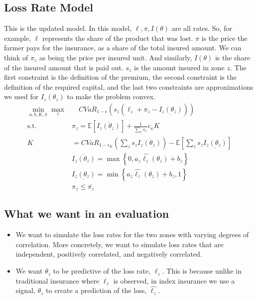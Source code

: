 \documentclass[11pt]{article}
\begin{document}
  \subsection{Loss Rate Model}
  This is the updated model. In this model, $\ell, \pi, I(\theta)$ are all rates. So, for example, $\ell$ represents the share of the product that was lost. $\pi$ is the price the farmer pays for the insurance, as a share of the total insured amount. We can think of $\pi_z$ as being the price per insured unit. And similarly, $I(\theta)$ is the share of the insured amount that is paid out. $s_z$ is the amount insured in zone $z$. The first constraint is the definition of the premium, the second constraint is the definition of the required capital, and the last two constraints are approximations we used for $I_z(\theta_z)$ to make the problem convex.    
  \begin{align}
    \min_{a,b,K,\pi} \max_z &\quad CVaR_{1-\epsilon}\left (s_z \left (\ell_z  + \pi_z - \underline{I_z(\theta_z)}\right ) \right )\\
    \text{s.t.   } & \pi_z  = \mathbb{E}\left [ \overline{I_z(\theta_z)} \right ] + \frac{1}{\sum_z s_z} c_{\kappa} K \\
    K &= CVaR_{1-\epsilon_K} \left( \sum_z s_z\overline{I_z(\theta_z)} \right ) - \mathbb{E}\left [ \sum_z s_z\underline{I_z(\theta_z)} \right ]\\
    &\overline{I_z(\theta_z)} = \max \left \{0,a_z\hat{\ell_z}(\theta_z) + b_z \right \}\\
    &\underline{I_z(\theta_z)} = \min \left \{a_z\hat{\ell_z}(\theta_z)+b_z,1 \right \}\\
    &\pi_z \leq \overline{\pi_z}
  \end{align}

  \subsection{What we want in an evaluation}
  \begin{itemize}
      \item We want to simulate the loss rates for the two zones with varying degrees of correlation. More concretely, we want to simulate loss rates that are independent, positively correlated, and negatively correlated. 
      \item We want $\theta_z$ to be predictive of the loss rate, $\ell_z$. This is because unlike in traditional insurance where $\ell_z$ is observed, in index insurance we use a signal, $\theta_z$ to create a prediction of the loss, $\hat{\ell_z}$. 
  \end{itemize}
\end{document}
